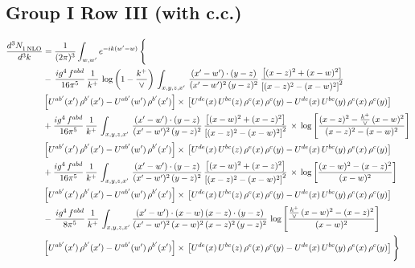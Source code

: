 \documentclass[10pt]{article}
\numberwithin{equation}{section}
\begin{document}
\subsection{Group I Row III (with c.c.)}
\begin{align}
   \frac{d^{3}N_{1\,\rm NLO}^{\rm}}{d^{3}k}  & =  \frac{1}{(2\pi)^{3}}  \int_{w, w^\prime} e^{-ik(w^\prime-w)}\, \Bigg\{\notag \\
& -\,\frac{ig^{4}\,f^{abd}}{16\pi^{5}}\,\frac{1}{k^{+}}\,\log{\left(1-\frac{k^{+}}{\vee}\right)}\,\int_{x,y,z,x'}\, \frac{(x'-w')\cdot (y-z)}{(x'-w')^{2}\,(y-z)^{2}}\,\frac{\left[(x-z)^{2}+(x-w)^{2}\right]}{\left[(x-z)^{2}-(x-w)^{2}\right]^{2}}\notag \\ & \left[U^{ab'}(x')\,\rho^{b'}(x')-U^{ab'}(w')\, \rho^{b'}(x')\right]\times\, \left[U^{de}(x)\,U^{bc}(z)\, \rho^{e}(x)\,\rho^{c}(y)-U^{de}(x)\,U^{bc}(y)\,\rho^{e}(x)\,\rho^{c}(y)\right] \notag \\
&  +\frac{ig^{4}\,f^{abd}}{16\pi^{5}}\, \frac{1}{k^{+}}\,\int_{x,y,z,x'}\, \frac{(x'-w')\cdot (y-z)}{(x'-w')^{2}\,(y-z)^{2}}\, \frac{\left[(x-w)^{2}+(x-z)^{2}\right]}{\left[(x-z)^{2}-(x-w)^{2}\right]^{2}}\, \times\, \log{\left[\frac{(x-z)^{2}-\frac{k^{+}}{\vee}\,(x-w)^{2}}{(x-z)^{2}-(x-w)^{2}}\right]}\notag \\ & \left[U^{ab'}(x')\,\rho^{b'}(x')-U^{ab'}(w')\, \rho^{b'}(x')\right]\times\, \left[U^{de}(x)\,U^{bc}(z)\, \rho^{e}(x)\,\rho^{c}(y)-U^{de}(x)\,U^{bc}(y)\,\rho^{e}(x)\,\rho^{c}(y)\right] \notag \\
&  +\frac{ig^{4}\,f^{abd}}{16\pi^{5}}\, \frac{1}{k^{+}}\,\int_{x,y,z,x'}\, \frac{(x'-w')\cdot (y-z)}{(x'-w')^{2}\,(y-z)^{2}}\, \frac{\left[(x-w)^{2}+(x-z)^{2}\right]}{\left[(x-z)^{2}-(x-w)^{2}\right]^{2}}\, \times\, \log{\left[\frac{(x-w)^{2}-(x-z)^{2}}{(x-w)^{2}}\right]}\notag \\ & \left[U^{ab'}(x')\,\rho^{b'}(x')-U^{ab'}(w')\, \rho^{b'}(x')\right]\times\, \left[U^{de}(x)\,U^{bc}(z)\, \rho^{e}(x)\,\rho^{c}(y)-U^{de}(x)\,U^{bc}(y)\,\rho^{e}(x)\,\rho^{c}(y)\right] \notag \\
&-\, \frac{ig^{4}\,f^{abd}}{8\pi^{5}}\,\frac{1}{k^{+}}\,\int_{x,y,z,x'}\frac{(x'-w')\cdot (x-w)\, (x-z)\cdot (y-z)}{(x'-w')^{2}\, (x-w)^{2}\, (x-z)^{2}\, (y-z)^{2}}\,\log{\left[\frac{\frac{k^{+}}{\vee}\,(x-w)^{2}-(x-z)^{2}}{(x-w)^{2}}\right]} \notag \\ & \left[U^{ab'}(x')\,\rho^{b'}(x')-U^{ab'}(w')\, \rho^{b'}(x')\right]\times\, \left[U^{de}(x)\,U^{bc}(z)\, \rho^{e}(x)\,\rho^{c}(y)-U^{de}(x)\,U^{bc}(y)\,\rho^{e}(x)\,\rho^{c}(y)\right]\Bigg\}
\end{align}
\end{document}
